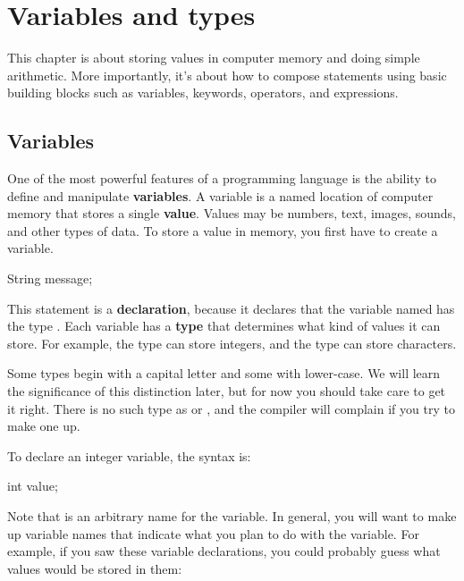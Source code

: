 \chapter{Variables and types}

This chapter is about storing values in computer memory and doing simple arithmetic.
More importantly, it's about how to compose statements using basic building blocks such as variables, keywords, operators, and expressions.


\section{Variables}


One of the most powerful features of a programming language is the ability to define and manipulate {\bf variables}.
A variable is a named location of computer memory that stores a single {\bf value}.
Values may be numbers, text, images, sounds, and other types of data.
To store a value in memory, you first have to create a variable.

\begin{code}
    String message;
\end{code}


This statement is a {\bf declaration}, because it declares that the variable named  has the type .
Each variable has a {\bf type} that determines what kind of values it can store.
For example, the  type can store integers, and the  type can store characters.

Some types begin with a capital letter and some with lower-case.
We will learn the significance of this distinction later, but for now you should take care to get it right.
There is no such type as  or , and the compiler will complain if you try to make one up.

To declare an integer variable, the syntax is:

\begin{code}
    int value;
\end{code}

Note that  is an arbitrary name for the variable.
In general, you will want to make up variable names that indicate what you plan to do with the variable.
For example, if you saw these variable declarations, you could probably guess what values would be stored in them:


